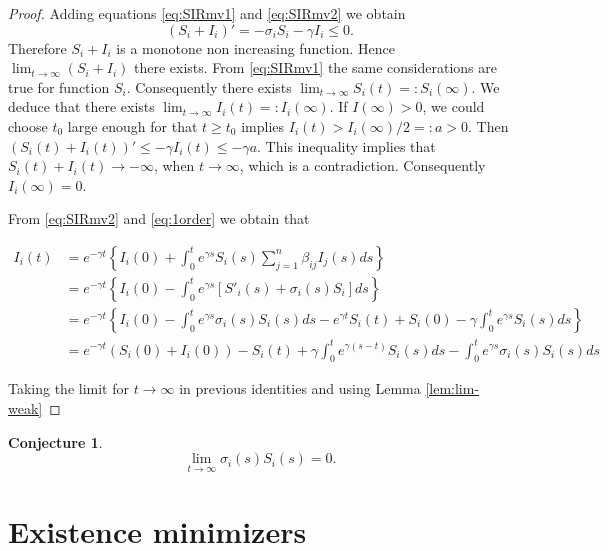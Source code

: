 \documentclass[a4paper,10pt]{article}
\newtheorem{conj}[thm]{Conjecture}
\theoremstyle{remark}
\begin{document}
\begin{proof} Adding equations \eqref{eq:SIRmv1} and \eqref{eq:SIRmv2} we obtain 
\[
 (S_i+I_i)'=-\sigma_iS_i-\gamma I_i\leq 0.
\]
Therefore  $S_i+I_i$ is a monotone non increasing function. Hence $\lim_{t\to\infty} (S_i+I_i)$ there exists. From \eqref{eq:SIRmv1} the same considerations are true for function $S_i$. Consequently there exists $\lim_{t\to\infty} S_i(t)=:S_i(\infty)$. We deduce that there exists  $\lim_{t\to\infty} I_i(t)=:I_i(\infty)$. If $I(\infty)>0$, we could choose $t_0$ large enough for that $t\geq t_0$ implies $I_i(t)>I_i(\infty)/2=:a>0$. Then $(S_i(t)+I_i(t))'\leq -\gamma I_i(t)\leq -\gamma a$. This inequality implies that $S_i(t) +I_i(t)\to -\infty$, when $t\to\infty$, which is a contradiction. Consequently $I_i(\infty)=0$. 

 
From  \eqref{eq:SIRmv2} and \eqref{eq:1order} we obtain that


\[
\begin{split}
 I_i(t)&=e^{-\gamma t}
 \left\{
    I_i(0)+\int_0^t e^{\gamma s} S_{i}(s) \sum\limits_{j=1}^{n} \beta_{i j} I_{j}(s)ds
\right\}\\
&= e^{-\gamma t}
 \left\{
    I_i(0)-\int_0^t e^{\gamma s} \left[S'_i(s)+\sigma_i(s)S_i\right]ds 
  \right\}\\
  &= e^{-\gamma t}
 \left\{
    I_i(0)-\int_0^t e^{\gamma s}  \sigma_i(s)S_i(s)ds
    -e^{\gamma t}S_i(t)+S_i(0)-\gamma\int_0^t e^{\gamma s} S_{i}(s) ds 
  \right\}\\
   &= e^{-\gamma t}\left(S_i(0)+ I_i(0)  \right)-S_i(t)
   +\gamma \int_0^t e^{\gamma (s-t)}S_{i}(s)ds-\int_0^t e^{\gamma s}  \sigma_i(s)S_i(s)ds
 \end{split}
\]

Taking the limit for $t\to\infty$ in previous identities and using Lemma \ref{lem:lim-weak} 
\end{proof}


\begin{conj} 
 \[
 \lim\limits_{t\to\infty} \sigma_i(s)S_i(s)
=0.
\]

\end{conj}


\section{Existence minimizers}
\end{document}

